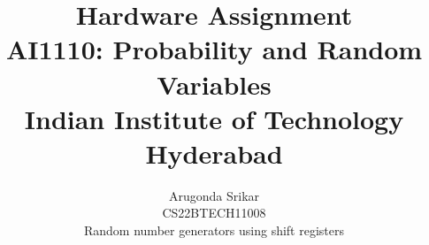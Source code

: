 \documentclass[12pt, journal]{IEEEtran}
\title{Hardware Assignment \\ \Large AI1110: Probability and Random Variables \\ \large Indian Institute of Technology Hyderabad}
\author{Arugonda Srikar \\ \normalsize CS22BTECH11008 \\ \large Random number generators using shift registers}
\DeclareMathOperator*{\Res}{Res}
\begin{document}
	\newtheorem{theorem}{Theorem}[section]
	\newtheorem{problem}{Problem}
	\newtheorem{proposition}{Proposition}[section]
	\newtheorem{lemma}{Lemma}[section]
	\newtheorem{corollary}[theorem]{Corollary}
	\newtheorem{example}{Example}[section]
	\newtheorem{definition}[problem]{Definition}
	\newcommand{\BEQA}{\begin{eqnarray}}
	\newcommand{\EEQA}{\end{eqnarray}}
	\newcommand{\define}{\stackrel{\triangle}{=}}

	


	\providecommand{\mbf}{\mathbf}
	\providecommand{\pr}[1]{\ensuremath{\Pr\left(#1\right)}}
	\providecommand{\qfunc}[1]{\ensuremath{Q\left(#1\right)}}
	\providecommand{\sbrak}[1]{\ensuremath{{}\left[#1\right]}}
	\providecommand{\lsbrak}[1]{\ensuremath{{}\left[#1\right.}}
	\providecommand{\rsbrak}[1]{\ensuremath{{}\left.#1\right]}}
	\providecommand{\brak}[1]{\ensuremath{\left(#1\right)}}
	\providecommand{\lbrak}[1]{\ensuremath{\left(#1\right.}}
	\providecommand{\rbrak}[1]{\ensuremath{\left.#1\right)}}
	\providecommand{\cbrak}[1]{\ensuremath{\left\{#1\right\}}}
	\providecommand{\lcbrak}[1]{\ensuremath{\left\{#1\right.}}
	\providecommand{\rcbrak}[1]{\ensuremath{\left.#1\right\}}}
	\theoremstyle{remark}
	\newtheorem{rem}{Remark}
	\newcommand{\sgn}{\mathop{\mathrm{sgn}}}
	\providecommand{\abs}[1]{\left\vert#1\right\vert}
	\providecommand{\res}[1]{\Res\displaylimits_{#1}} 
	\providecommand{\norm}[1]{\left\lVert#1\right\rVert}
	\providecommand{\mtx}[1]{\mathbf{#1}}
	\providecommand{\mean}[1]{E\left[ #1 \right]}
	\providecommand{\fourier}{\overset{\mathcal{F}}{ \rightleftharpoons}}
	\providecommand{\system}{\overset{\mathcal{H}}{ \longleftrightarrow}}
	\newcommand{\solution}{\noindent \textbf{Solution: }}
	\newcommand{\cosec}{\,\text{cosec}\,}
	\providecommand{\dec}[2]{\ensuremath{\overset{#1}{\underset{#2}{\gtrless}}}}
	\newcommand{\myvec}[1]{\ensuremath{\begin{pmatrix}#1\end{pmatrix}}}
	\newcommand{\mydet}[1]{\ensuremath{\begin{vmatrix}#1\end{vmatrix}}}
	
\end{document}
